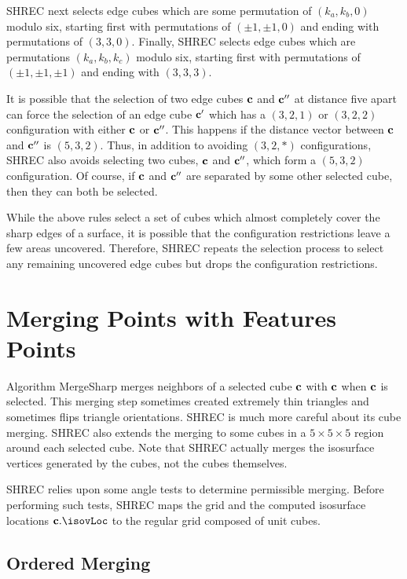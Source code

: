 SHREC next selects edge cubes which are some permutation
of $(k_a,k_b,0)$ modulo six,
starting first with permutations of $(\pm 1, \pm 1, 0)$
and ending with permutations of $(3, 3, 0)$.
Finally, SHREC selects edge cubes which are permutations
$(k_a, k_b, k_c)$ modulo six,
starting first with permutations of $(\pm 1, \pm 1, \pm 1)$
and ending with $(3, 3, 3)$.

It is possible that the selection of two edge cubes $\mathbf{c}$ and $\mathbf{c}''$
at distance five apart can force the selection of an edge cube $\mathbf{c}'$
which has a $(3,2,1)$ or $(3,2,2)$ configuration 
with either $\mathbf{c}$ or $\mathbf{c}''$.
This happens if the distance vector between $\mathbf{c}$ and $\mathbf{c}''$
is $(5,3,2)$.
Thus, in addition to avoiding $(3,2,*)$ configurations,
SHREC also avoids selecting two cubes, $\mathbf{c}$ and $\mathbf{c}''$, 
which form a $(5,3,2)$ configuration.
Of course, if $\mathbf{c}$ and $\mathbf{c}''$ are separated by some other selected cube,
then they can both be selected.

While the above rules select a set of cubes which almost completely cover
the sharp edges of a surface,
it is possible that the configuration restrictions leave a few areas uncovered.
Therefore, SHREC repeats the selection process to select any remaining
uncovered edge cubes but drops the configuration restrictions.


\section{Merging Points with Features Points}
\label{section:merging}

Algorithm MergeSharp merges neighbors of a selected cube $\mathbf{c}$ 
with $\mathbf{c}$ when $\mathbf{c}$ is selected.
This merging step sometimes created extremely thin triangles and 
sometimes flips triangle orientations.
SHREC is much more careful about its cube merging.
SHREC also extends the merging to some cubes in a $5 \times 5 \times 5$ region 
around each selected cube.
Note that SHREC actually merges the isosurface vertices generated by the cubes,
not the cubes themselves.

SHREC relies upon some angle tests to determine permissible merging.
Before performing such tests, SHREC maps the grid 
and the computed isosurface locations $\cb.\isovLoc$
to the regular grid composed of unit cubes.

\subsection{Ordered Merging}
\label{section:ordered_merging}


